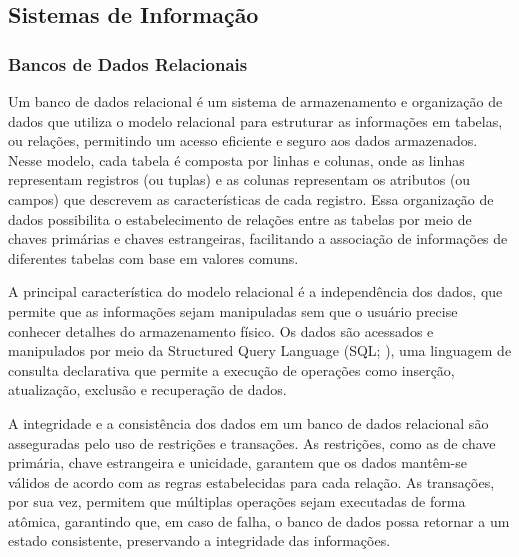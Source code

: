 



\subsection{Sistemas de Informação}
\label{sec:sistemas-informacao}
\subsubsection{Bancos de Dados Relacionais}

Um banco de dados relacional \citep{relational-database,relational-database-2} é um sistema de armazenamento e organização de dados que utiliza o modelo relacional para estruturar as informações em tabelas, ou relações, permitindo um acesso eficiente e seguro aos dados armazenados. Nesse modelo, cada tabela é composta por linhas e colunas, onde as linhas representam registros (ou tuplas) e as colunas representam os atributos (ou campos) que descrevem as características de cada registro. Essa organização de dados possibilita o estabelecimento de relações entre as tabelas por meio de chaves primárias e chaves estrangeiras, facilitando a associação de informações de diferentes tabelas com base em valores comuns.

A principal característica do modelo relacional é a independência dos dados, que permite que as informações sejam manipuladas sem que o usuário precise conhecer detalhes do armazenamento físico. Os dados são acessados e manipulados por meio da Structured Query Language (SQL; \citealp{sequel}), uma linguagem de consulta declarativa que permite a execução de operações como inserção, atualização, exclusão e recuperação de dados.

A integridade e a consistência dos dados em um banco de dados relacional são asseguradas pelo uso de restrições e transações. As restrições, como as de chave primária, chave estrangeira e unicidade, garantem que os dados mantêm-se válidos de acordo com as regras estabelecidas para cada relação. As transações, por sua vez, permitem que múltiplas operações sejam executadas de forma atômica, garantindo que, em caso de falha, o banco de dados possa retornar a um estado consistente, preservando a integridade das informações.

